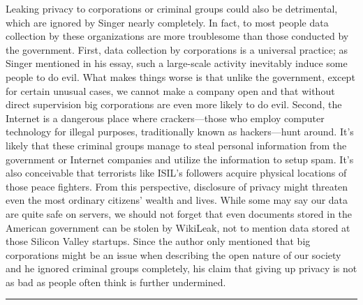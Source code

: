 \documentclass{writing}
\begin{document}
Leaking privacy to corporations or criminal groups could also be
detrimental, which are ignored by Singer nearly completely. In fact, to
most people data collection by these organizations are more troublesome
than those conducted by the government. First, data collection by
corporations is a universal practice; as Singer mentioned in his essay,
such a large-scale activity inevitably induce some people to do evil.
What makes things worse is that unlike the government, except for
certain unusual cases, we cannot make a company open and that without
direct supervision big corporations are even more likely to do evil.
Second, the Internet is a dangerous place where crackers---those who
employ computer technology for illegal purposes, traditionally known as
hackers---hunt around. It's likely that these criminal groups manage to
steal personal information from the government or Internet companies and
utilize the information to setup spam. It's also conceivable that
terrorists like ISIL's followers acquire physical locations of those
peace fighters. From this perspective, disclosure of privacy might
threaten even the most ordinary citizens' wealth and lives. While some
may say our data are quite safe on servers, we should not forget that
even documents stored in the American government can be stolen by
WikiLeak, not to mention data stored at those Silicon Valley startups.
Since the author only mentioned that big corporations might be an issue
when describing the open nature of our society and he ignored criminal
groups completely, his claim that giving up privacy is not as bad as
people often think is further undermined.

\begin{center}\rule{0.5\linewidth}{\linethickness}\end{center}
\end{document}
